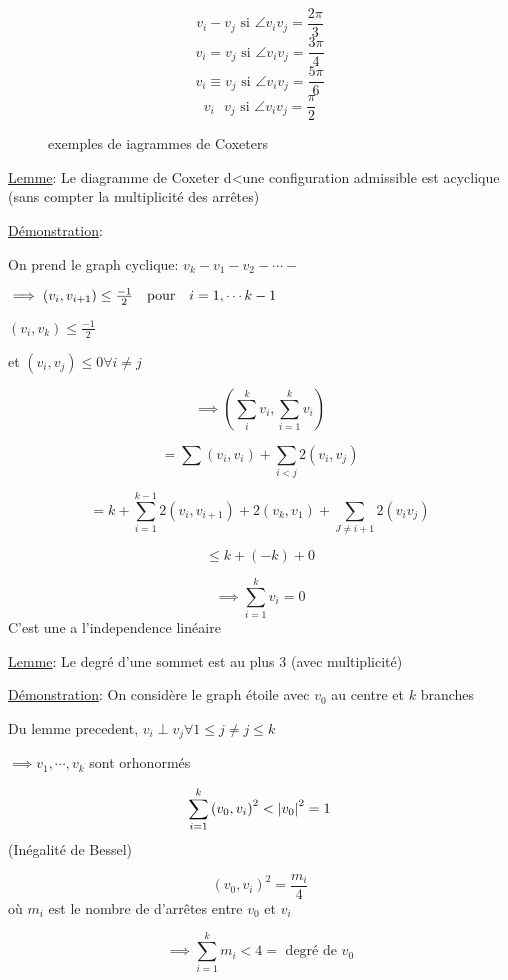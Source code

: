 \[ v_i - v_j \text{ si } \angle v_i v_j = \frac{2\pi}{3}    \]
\[ v_i = v_j \text{ si } \angle v_i v_j = \frac{3\pi}{4}    \]
\[ v_i \equiv v_j \text{ si } \angle v_i v_j = \frac{5\pi}{6}    \]
\[ v_i \ \ \  v_j \text{ si } \angle v_i v_j = \frac{\pi}{2}    \]

\begin{figure}[ht]
    \centering
    \caption{exemples de iagrammes de Coxeters}
    \label{fig:exemples-de-iagrammes-de-coxeters}
\end{figure}

\underline{Lemme}: Le diagramme de Coxeter d<une configuration admissible est acyclique (sans compter la multiplicité des arrêtes)  


\underline{Démonstration}:

On prend le graph cyclique: 
\(v_k - v_1 - v_2 - \dotsb -\)

\(\implies (v_i, v_{i+1}) \leq \frac{-1}{2} \qq{pour} i = 1, \dotsb k-1\)

\((v_i, v_k) \leq \frac{-1}{2} \)

et \((v_i , v_j ) \leq 0 \forall i \neq j\)


\[ \implies (\sum_{i}^{k} v_{i}, \sum_{i=1}^{k} v_i ) \]

\[ = \sum (v_i , v_i ) + \sum_{i<j} 2 (v_i , v_j )  \]

\[ = k + \sum_{i=1}^{k-1} 2(v_i , v_{i+1} ) +2 (v_k , v_1 ) + \sum_{J\neq i+1} 2 (v_i v_j )  \]

\[ \leq k + (-k ) + 0  \]

\[ \implies \sum_{i=1}^{k} v_i =0 \]
C'est une \lightning a l'independence linéaire

\underline{Lemme}: Le degré d'une sommet est au plus 3 (avec multiplicité)  


\underline{Démonstration}: On considère le graph étoile avec \(v_0\) au centre et \(k\) branches 

Du lemme precedent, \(v_i \perp v_j \forall 1 \leq j \neq j \leq k\)

\(\implies v_1 , \dotsb , v_k\) sont orhonormés 

\[ \sum_{i=1}^{k} \left( v_0 , v_i \right)^{2} < \abs{v_{0}}^{2} =1  \]
(Inégalité de Bessel) 


\[ \left( v_0 , v_i  \right)^{2} = \frac{m_i}{4}  \]
où \(m_i\) est le nombre de d'arrêtes entre \( v_0 \) et \(v_i\)

\[ \implies \sum_{i=1}^{k} m_i < 4 = \text{ degré de } v_0 \]








